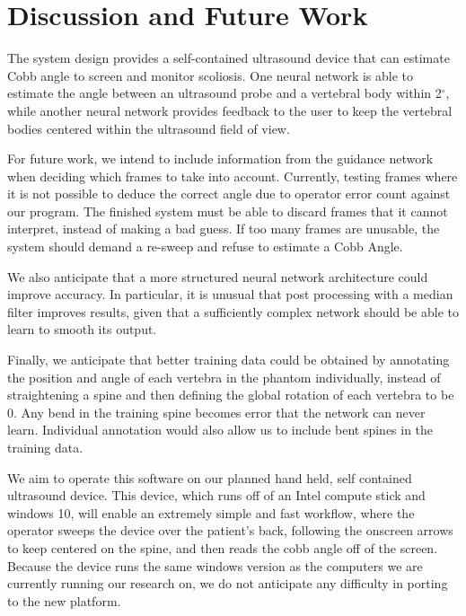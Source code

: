 \documentclass{article}
\begin{document}
\section{Discussion and Future Work}
The system design provides a self-contained ultrasound device that can estimate Cobb angle to screen and monitor scoliosis.  One neural network is able to estimate the angle between an ultrasound probe and a vertebral body within 2$^\circ$, while another neural network provides feedback to the user to keep the vertebral bodies centered within the ultrasound field of view.  

For future work, we intend to include information from the guidance network when deciding which frames to take into account. Currently, testing frames where it is not possible to deduce the correct angle due to operator error count against our program. The finished system must be able to discard frames that it cannot interpret, instead of making a bad guess. If too many frames are unusable, the system should demand a re-sweep and refuse to estimate a Cobb Angle.

We also anticipate that a more structured neural network architecture could improve accuracy. In particular, it is unusual that post processing  with a median filter improves results, given that a sufficiently complex network should be able to learn to smooth its output. 

Finally, we anticipate that better training data could be obtained by annotating the position and angle of each vertebra in the phantom individually, instead of straightening a spine and then defining the global rotation of each vertebra to be 0. Any bend in the training spine becomes error that the network can never learn. Individual annotation would also allow us to include bent spines in the training data.

We aim to operate this software on our planned hand held, self contained ultrasound device. This device, which runs off of an Intel compute stick and windows 10, will enable an extremely simple and fast workflow, where the operator sweeps the device over the patient’s back, following the onscreen arrows to keep centered on the spine, and then reads the cobb angle off of the screen. Because the device runs the same windows version as the computers we are currently running our research on, we do not anticipate any difficulty in porting to the new platform.
\end{document}
